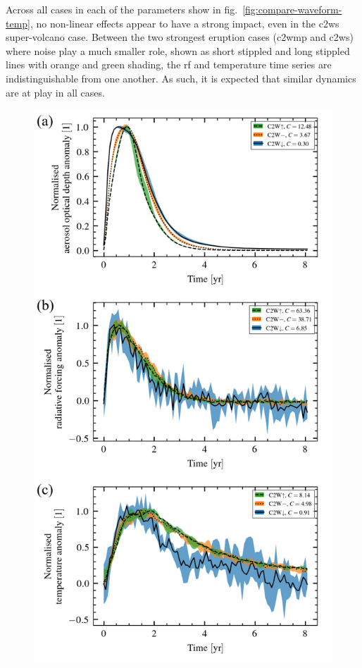 \documentclass{ametsocV6.1}
\begin{document}
Across all cases in each of the parameters show in fig.~\ref{fig:compare-waveform-temp},
no non-linear effects appear to have a strong impact, even in the \gls{c2ws}
super-volcano case. Between the two strongest eruption cases (\gls{c2wmp} and
\gls{c2ws}) where noise play a much smaller role, shown as short stippled and long
stippled lines with orange and green shading, the \gls{rf} and temperature time series
are indistinguishable from one another. As such, it is expected that similar dynamics
are at play in all cases.

\begin{figure}
  \centering
  \includegraphics{figures/figure1.png}


\end{figure}
\end{document}
